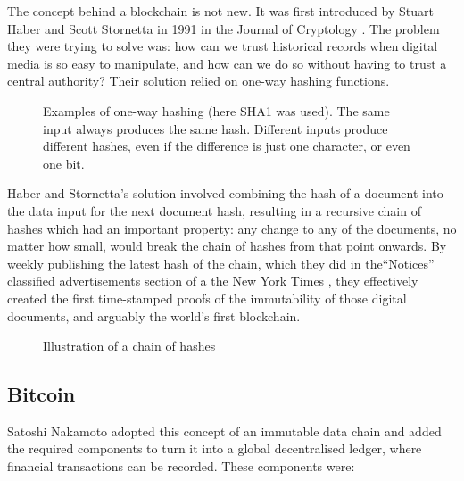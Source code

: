 The concept behind a blockchain is not new. It was first introduced by Stuart Haber and Scott Stornetta in 1991 in the Journal of Cryptology \cite{haberHowTimeStampDigital1991}. The problem they were trying to solve was: how can we trust historical records when digital media is so easy to manipulate, and how can we do so without having to trust a central authority? Their solution relied on one-way hashing functions.


\begin{figure}[h]
    \centering
    
    \caption[One-way hashing examples]{Examples of one-way hashing (here SHA1 was used). The same input always produces the same hash. Different inputs produce different hashes, even if the difference is just one character, or even one bit.}
    \label{fig:hashing}
\end{figure}

Haber and Stornetta's solution involved combining the hash of a document into the data input for the next document hash, resulting in a recursive chain of hashes which had an important property: any change to any of the documents, no matter how small, would break the chain of hashes from that point onwards.
By weekly publishing the latest hash of the chain, which they did in the``Notices'' classified advertisements section of a the New York Times \cite{whitakerArtBlockchainPrimer2019}, they effectively created the first time-stamped proofs of the immutability of those digital documents, and arguably the world's first blockchain.

\begin{figure}[h]
    \centering
    
    \caption[Illustration of a chain of hashes]{Illustration of a chain of hashes}
    \label{fig:hashing}
\end{figure}


\subsection{Bitcoin}

Satoshi Nakamoto \cite{nakamotoBitcoinPeertopeerElectronic2008a}  adopted this concept of an immutable data chain and added the required components to turn it into a global decentralised ledger, where financial transactions can be recorded. These components were:

